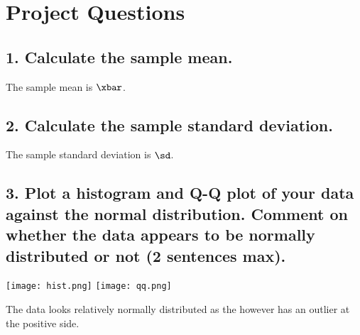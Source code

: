 \documentclass[12pt,oneside]{book}
\begin{document}
\section*{Project Questions}
\hspace*{.02\textwidth}%
\begin{minipage}{.96\textwidth}
\subsection*{1. Calculate the sample mean.}
The sample mean is $\xbar$.

\subsection*{2. Calculate the sample standard deviation.}
The sample standard deviation is $\sd$.

\subsection*{3. Plot a histogram and Q-Q plot of your data against the normal distribution. Comment
on whether the data appears to be normally distributed or not (2 sentences max).}
\begin{center}
\texttt{[image: hist.png]}
\texttt{[image: qq.png]}
\end{center}
The data looks relatively normally distributed as the however has an outlier at the positive side.
\end{minipage}%
\newpage
\end{document}
